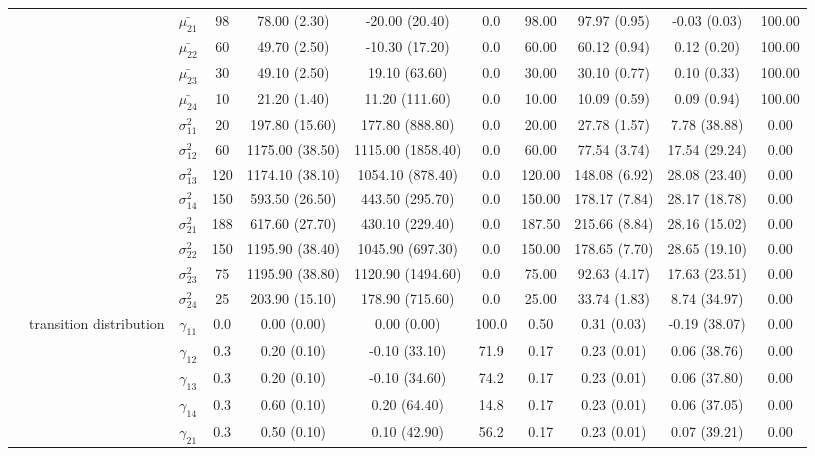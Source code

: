 \begin{table}[h]
{\begin{tabular}{ccccccccccc}
 &  & $\bar{\mu_{21}}$ & 98 & 78.00 (2.30) & -20.00 (20.40) & 0.0 & 98.00 & 97.97 (0.95) & -0.03 (0.03) & 100.00 \\
 &  & $\bar{\mu_{22}}$ & 60 & 49.70 (2.50) & -10.30 (17.20) & 0.0 & 60.00 & 60.12 (0.94) & 0.12 (0.20) & 100.00 \\
 &  & $\bar{\mu_{23}}$ & 30 & 49.10 (2.50) & 19.10 (63.60) & 0.0 & 30.00 & 30.10 (0.77) & 0.10 (0.33) & 100.00 \\
 &  & $\bar{\mu_{24}}$ & 10 & 21.20 (1.40) & 11.20 (111.60) & 0.0 & 10.00 & 10.09 (0.59) & 0.09 (0.94) & 100.00 \\
 &  & $\sigma^2_{11}$ & 20 & 197.80 (15.60) & 177.80 (888.80) & 0.0 & 20.00 & 27.78 (1.57) & 7.78 (38.88) & 0.00 \\
 &  & $\sigma^2_{12}$ & 60 & 1175.00 (38.50) & 1115.00 (1858.40) & 0.0 & 60.00 & 77.54 (3.74) & 17.54 (29.24) & 0.00 \\
 &  & $\sigma^2_{13}$ & 120 & 1174.10 (38.10) & 1054.10 (878.40) & 0.0 & 120.00 & 148.08 (6.92) & 28.08 (23.40) & 0.00 \\
 &  & $\sigma^2_{14}$ & 150 & 593.50 (26.50) & 443.50 (295.70) & 0.0 & 150.00 & 178.17 (7.84) & 28.17 (18.78) & 0.00 \\
 &  & $\sigma^2_{21}$ & 188 & 617.60 (27.70) & 430.10 (229.40) & 0.0 & 187.50 & 215.66 (8.84) & 28.16 (15.02) & 0.00 \\
 &  & $\sigma^2_{22}$ & 150 & 1195.90 (38.40) & 1045.90 (697.30) & 0.0 & 150.00 & 178.65 (7.70) & 28.65 (19.10) & 0.00 \\
 &  & $\sigma^2_{23}$ & 75 & 1195.90 (38.80) & 1120.90 (1494.60) & 0.0 & 75.00 & 92.63 (4.17) & 17.63 (23.51) & 0.00 \\
 &  & $\sigma^2_{24}$ & 25 & 203.90 (15.10) & 178.90 (715.60) & 0.0 & 25.00 & 33.74 (1.83) & 8.74 (34.97) & 0.00 \\
 & transition distribution & $\gamma_{11}$ & 0.0 & 0.00 (0.00) & 0.00 (0.00) & 100.0 & 0.50 & 0.31 (0.03) & -0.19 (38.07) & 0.00 \\
 & \multirow{15}{*}{} & $\gamma_{12}$ & 0.3 & 0.20 (0.10) & -0.10 (33.10) & 71.9 & 0.17 & 0.23 (0.01) & 0.06 (38.76) & 0.00 \\
 &  & $\gamma_{13}$ & 0.3 & 0.20 (0.10) & -0.10 (34.60) & 74.2 & 0.17 & 0.23 (0.01) & 0.06 (37.80) & 0.00 \\
 &  & $\gamma_{14}$ & 0.3 & 0.60 (0.10) & 0.20 (64.40) & 14.8 & 0.17 & 0.23 (0.01) & 0.06 (37.05) & 0.00 \\
 &  & $\gamma_{21}$ & 0.3 & 0.50 (0.10) & 0.10 (42.90) & 56.2 & 0.17 & 0.23 (0.01) & 0.07 (39.21) & 0.00 \\

\end{tabular}}
\end{table}
